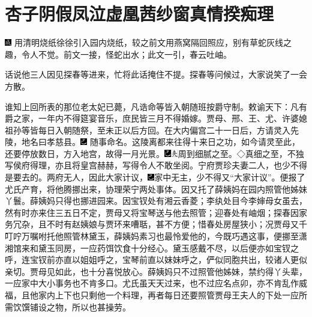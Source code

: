 

\chapter{杏子阴假凤泣虚凰\hspace{.5em}茜纱窗真情揆痴理}

{\includegraphics[width=3mm]{../Images/00005}  \kaishu 用清明烧纸徐徐引入园内烧纸，较之前文用燕窝隔回照应，别有草蛇灰线之趣，令人不觉。前文一接，怪蛇出水；此文一引，春云吐岫。}

话说他三人因见探春等进来，忙将此话掩住不提。探春等问候过，大家说笑了一会方散。

谁知上回所表的那位老太妃已薨，凡诰命等皆入朝随班按爵守制。敕谕天下：凡有爵之家，一年内不得筵宴音乐，庶民皆三月不得婚嫁。贾母、邢、王、尤、许婆媳祖孙等皆每日入朝随祭，至未正以后方回。在大内偏宫二十一日后，方请灵入先陵，地名曰孝慈县。{\includegraphics[width=3mm]{../Images/00003}  \kaishu 随事命名。}这陵离都来往得十来日之功，如今请灵至此，还要停放数日，方入地宫，故得一月光景。{\includegraphics[width=3mm]{../Images/00003}\includegraphics[width=3mm]{../Images/00012}\footnotesize \kaishu 周到细腻之至。◇真细之至，不独写侯府得理，亦且将皇宫赫赫，写得令人不敢坐阅。}宁府贾珍夫妻二人，也少不得是要去的。两府无人，因此大家计议，{\includegraphics[width=3mm]{../Images/00003}家中无主，少不得又``大家计议''。}便报了尤氏产育，将他腾挪出来，协理荣宁两处事体。因又托了薛姨妈在园内照管他姊妹丫鬟。薛姨妈只得也挪进园来。因宝钗处有湘云香菱；李纨处目今李婶母女虽去，然有时亦来住三五日不定，贾母又将宝琴送与他去照管；迎春处有岫烟；探春因家务冗杂，且不时有赵姨娘与贾环来嘈聒，甚不方便；惜春处房屋狭小；况贾母又千叮咛万嘱咐托他照管林黛玉，薛姨妈素习也最怜爱他的，今既巧遇这事，便挪至潇湘馆来和黛玉同房，一应药饵饮食十分经心。黛玉感戴不尽，以后便亦如宝钗之呼，连宝钗前亦直以姐姐呼之，宝琴前直以妹妹呼之，俨似同胞共出，较诸人更似亲切。贾母见如此，也十分喜悦放心。薛姨妈只不过照管他姊妹，禁约得丫头辈，一应家中大小事务也不肯多口。尤氏虽天天过来，也不过应名点卯，亦不肯乱作威福，且他家内上下也只剩他一个料理，再者每日还要照管贾母王夫人的下处一应所需饮馔铺设之物，所以也甚操劳。

